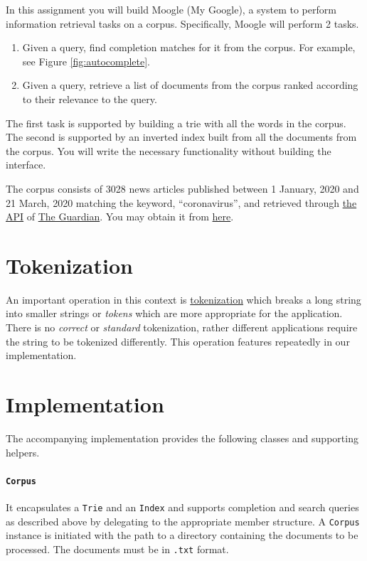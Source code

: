 \documentclass[addpoints]{exam}
\begin{document}
In this assignment you will build Moogle (My Google), a system to perform information retrieval tasks on a corpus. Specifically, Moogle will perform 2 tasks.
\begin{enumerate}
\item Given a query, find completion matches for it from the corpus. For example, see Figure \ref{fig:autocomplete}.
\item Given a query, retrieve a list of documents from the corpus ranked according to their relevance to the query.
\end{enumerate}

The first task is supported by building a trie with all the words in the corpus. The second is supported by an inverted index built from all the documents from the corpus. You will write the necessary functionality without building the interface.

The corpus consists of 3028 news articles published between 1 January, 2020 and 21 March, 2020 matching the keyword, ``coronavirus'', and retrieved through \href{https://open-platform.theguardian.com}{the API} of \href{https://www.theguardian.com/}{The Guardian}. You may obtain it from \href{https://drive.google.com/file/d/1yCDm2d3Jj6Z5XcG_ut7mKB-gnWpjDc_S/view?usp=sharing}{here}.

\section{Tokenization}

An important operation in this context is \href{https://nlp.stanford.edu/IR-book/html/htmledition/tokenization-1.html}{tokenization} which breaks a long string into smaller strings or \textit{tokens} which are more appropriate for the application. There is no \textit{correct} or \textit{standard} tokenization, rather different applications require the string to be tokenized differently. This operation features repeatedly in our implementation.

\section{Implementation}

The accompanying implementation provides the following classes and supporting helpers.

\paragraph{\texttt{Corpus}} It encapsulates a \texttt{Trie} and an \texttt{Index} and supports completion and search queries as described above by delegating to the appropriate member structure. A \texttt{Corpus} instance is initiated with the path to a directory containing the documents to be processed. The documents must be in \texttt{.txt} format.
\end{document}

